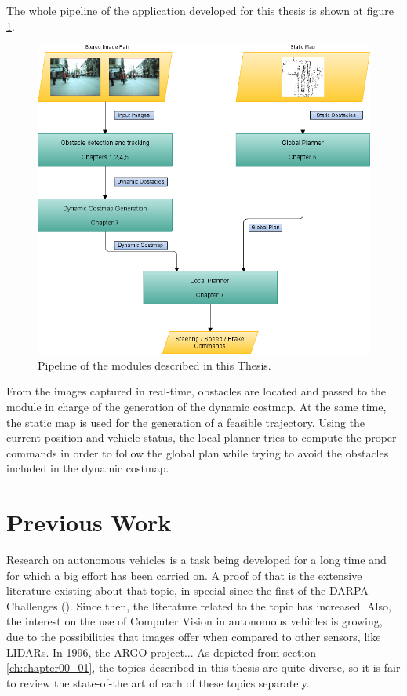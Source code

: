  The whole pipeline of the application developed for this thesis is shown at figure \ref{fig:cp00_pipeline}. 
 
\begin{figure}[thb]\label{fig:cp00_pipeline}
  \centering
  \includegraphics{pipeline}
  \caption{Pipeline of the modules described in this Thesis.}
\end{figure}

From the images captured in real-time, obstacles are located and passed to the module in charge of the generation of the dynamic costmap. At the same time, the static map is used for the generation of a feasible trajectory. Using the current position and vehicle status, the local planner tries to compute the proper commands in order to follow the global plan while trying to avoid the obstacles included in the dynamic costmap.

\section{Previous Work}\label{ch:chapter00_02}

Research on autonomous vehicles is a task being developed for a long time and for which a big effort has been carried on. A proof of that is the extensive literature existing about that topic, in special since the first of the DARPA Challenges (\cite{Buehler2007, Buehler2009}). Since then, the literature related to the topic has increased. Also, the interest on the use of Computer Vision in autonomous vehicles is growing, due to the possibilities that images offer when compared to other sensors, like \acp{LIDAR}.
In 1996, the ARGO project... 
As depicted from section \ref{ch:chapter00_01}, the topics described in this thesis are quite diverse, so it is fair to review the state-of-the art of each of these topics separately.

